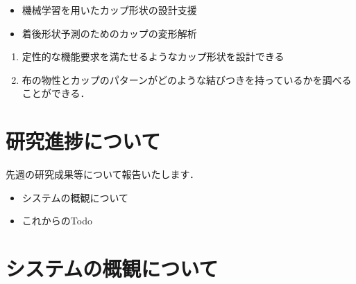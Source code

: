 \documentclass[11pt]{jsarticle}
\begin{document}
	\articleSPRabst
		\begin{itemize}
			\item 機械学習を用いたカップ形状の設計支援
			\item 着後形状予測のためのカップの変形解析
		\end{itemize}
		
		
	\articleSPRobj
		\begin{enumerate}
			\item 定性的な機能要求を満たせるようなカップ形状を設計できる
			\item 布の物性とカップのパターンがどのような結びつきを持っているかを調べることができる．
		\end{enumerate}
	\articleSPRitemsone
		
		\tableofcontents
		
		
	\articleSPRitemstwo
	\renewcommand{\labelitemi}{$\blacktriangledown$}
	\newcommand{\argmax}{\mathop{\rm arg~max}\limits}
	\newcommand{\argmin}{\mathop{\rm arg~min}\limits}
	\section{研究進捗について}
		先週の研究成果等について報告いたします．
		\begin{itemize}
			\item システムの概観について
			\item これからのTodo
		\end{itemize}
	\section{システムの概観について}
\end{document}
